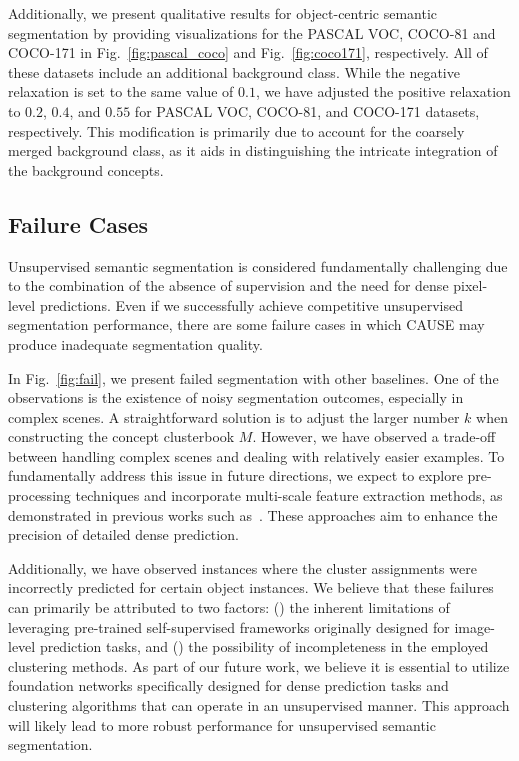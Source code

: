 \documentclass{article} \usepackage{iclr2024_conference,times}
\begin{document}
Additionally, we present qualitative results for object-centric semantic segmentation by providing visualizations for the PASCAL VOC, COCO-81 and COCO-171 in Fig.~\ref{fig:pascal_coco} and Fig.~\ref{fig:coco171}, respectively. All of these datasets include an additional background class. While the negative relaxation is set to the same value of $0.1$, we have adjusted the positive relaxation to $0.2$, $0.4$, and $0.55$ for PASCAL VOC, COCO-81, and COCO-171 datasets, respectively. This modification is primarily due to account for the coarsely merged background class, as it aids in distinguishing the intricate integration of the background concepts.

\subsection{Failure Cases}
Unsupervised semantic segmentation is considered fundamentally challenging due to the combination of the absence of supervision and the need for dense pixel-level predictions. Even if we successfully achieve competitive unsupervised segmentation performance, there are some failure cases in which CAUSE may produce inadequate segmentation quality. 

In Fig.~\ref{fig:fail}, we present failed segmentation with other baselines. One of the observations is the existence of noisy segmentation outcomes, especially in complex scenes. A straightforward solution is to adjust the larger number $k$ when constructing the concept clusterbook $M$. However, we have observed a trade-off between handling complex scenes and dealing with relatively easier examples. 
To fundamentally address this issue in future directions, we expect to explore pre-processing techniques and incorporate multi-scale feature extraction methods, as demonstrated in previous works such as~\citet{kirillov2019panoptic, kim2023universal, ranftl2021vision}. These approaches aim to enhance the precision of detailed dense prediction.

Additionally, we have observed instances where the cluster assignments were incorrectly predicted for certain object instances. We believe that these failures can primarily be attributed to two factors: (\lowercase\expandafter{}) the inherent limitations of leveraging pre-trained self-supervised frameworks originally designed for image-level prediction tasks, and (\lowercase\expandafter{}) the possibility of incompleteness in the employed clustering methods. As part of our future work, we believe it is essential to utilize foundation networks specifically designed for dense prediction tasks and clustering algorithms that can operate in an unsupervised manner. This approach will likely lead to more robust performance for unsupervised semantic segmentation.
\end{document}
